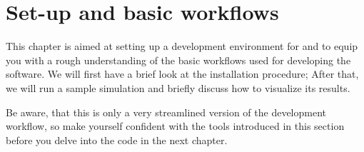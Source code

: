 \chapter{Set-up and basic workflows}

This chapter is aimed at setting up a development environment for
\eWoms and to equip you with a rough understanding of the basic
workflows used for developing the software. We will first have a
brief look at the installation procedure; After that, we will run a
sample simulation and briefly discuss how to visualize its results.

Be aware, that this is only a very streamlined version of the \eWoms
development workflow, so make yourself confident with the tools
introduced in this section before you delve into the \Cplusplus code
in the next chapter.





